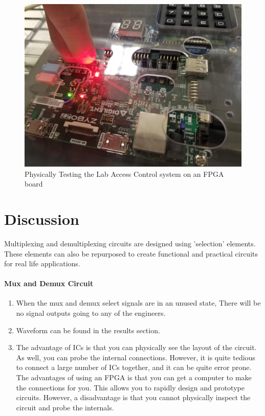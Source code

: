 \documentclass{article}
\begin{document}
    \begin{figure}[H]
        \includegraphics[width=\linewidth]{access_testing.jpg}
        \caption{Physically Testing the Lab Access Control system on an FPGA board}
        \label{fig:part2_testing}
    \end{figure}


    \section{Discussion}
    Multiplexing and demultiplexing circuits are designed using 'selection' elements.
    These elements can also be repurposed to create functional
    and practical circuits for real life applications.
    
    \paragraph{Mux and Demux Circuit}

    \begin{enumerate}
            \item When the mux and demux select signals are in an unused state,
                There will be no signal outputs going to any of the engineers.
                
            \item Waveform can be found in the results section.

            \item The advantage of ICs is that you can physically see the layout of the circuit. As well, you can probe the internal connections.
                However, it is quite tedious to connect a large number of ICs together,
                and it can be quite error prone.
                The advantages of using an FPGA is that you can get a computer to make the connections for you.
                This allows you to rapidly design and prototype circuits. However, a disadvantage is that
                you cannot physically inspect the circuit and probe the internals.
    \end{enumerate}
\end{document}

